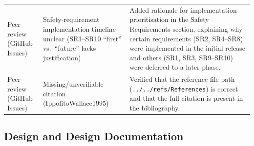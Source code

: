\documentclass{article}
\begin{document}
\begin{longtable}{p{3.2cm} p{3.8cm} p{7.4cm}}
Peer review (GitHub Issues)
  & Safety-requirement implementation timeline unclear (SR1--SR10
    ``first'' vs.\ ``future'' lacks justification)
  & Added rationale for implementation prioritisation in the Safety
    Requirements section, explaining why certain requirements (SR2,
    SR4--SR8) were implemented in the initial release and others (SR1,
    SR3, SR9--SR10) were deferred to a later phase.
\\[4pt]

Peer review (GitHub Issues)
  & Missing/unverifiable citation (IppolitoWallace1995)
  & Verified that the reference file path
    (\texttt{../../refs/References}) is correct and that the full
    citation is present in the bibliography.
\\

\bottomrule
\end{longtable}

\subsection{Design and Design Documentation}
\end{document}
